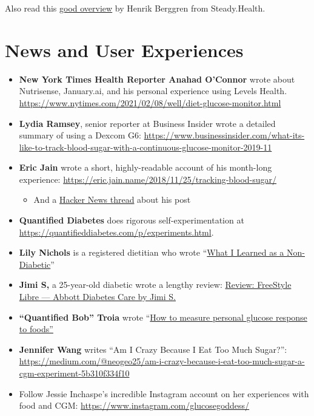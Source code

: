 \documentclass[
]{book}
\providecommand{\tightlist}{%
  \setlength{\itemsep}{0pt}\setlength{\parskip}{0pt}}
\begin{document}
Also read this \href{https://medium.com/steady-health/the-ultimate-guide-to-continuous-glucose-monitors-cgm-611eecc70c9a}{good overview} by Henrik Berggren from Steady.Health.

\hypertarget{news-and-user-experiences}{%
\chapter{News and User Experiences}\label{news-and-user-experiences}}

\begin{itemize}
\item
  \textbf{New York Times Health Reporter Anahad O'Connor} wrote about Nutrisense, January.ai, and his personal experience using Levels Health. \url{https://www.nytimes.com/2021/02/08/well/diet-glucose-monitor.html}
\item
  \textbf{Lydia Ramsey}, senior reporter at Business Insider wrote a detailed summary of using a Dexcom G6: \url{https://www.businessinsider.com/what-its-like-to-track-blood-sugar-with-a-continuous-glucose-monitor-2019-11}
\item
  \textbf{Eric Jain} wrote a short, highly-readable account of his month-long experience: \url{https://eric.jain.name/2018/11/25/tracking-blood-sugar/}

  \begin{itemize}
  \tightlist
  \item
    And a \href{https://news.ycombinator.com/item?id=18891772}{Hacker News thread} about his post
  \end{itemize}
\item
  \textbf{Quantified Diabetes} does rigorous self-experimentation at \url{https://quantifieddiabetes.com/p/experiments.html}.\\
\item
  \textbf{Lily Nichols} is a registered dietitian who wrote ``\href{https://lilynicholsrdn.com/cgm-experiment-non-diabetic-continuous-glucose-monitor/}{What I Learned as a Non-Diabetic}''
\item
  \textbf{Jimi S,} a 25-year-old diabetic wrote a lengthy review: \href{https://medium.com/@JimiS/product-review-freestyle-libre-abbott-diabetes-care-561ee446eaa}{Review: FreeStyle Libre --- Abbott Diabetes Care \textbar{} by Jimi S.}
\item
  \textbf{``Quantified Bob'' Troia} wrote ``\href{https://www.quantifiedbob.com/measuring-glycemic-glucose-response-foods/}{How to measure personal glucose response to foods''}
\item
  \textbf{Jennifer Wang} writes ``Am I Crazy Because I Eat Too Much Sugar?'': \url{https://medium.com/@neogeo25/am-i-crazy-because-i-eat-too-much-sugar-a-cgm-experiment-5b310f334f10}
\item
  Follow Jessie Inchaspe's incredible Instagram account on her experiences with food and CGM: \url{https://www.instagram.com/glucosegoddess/}
\end{itemize}
\end{document}
